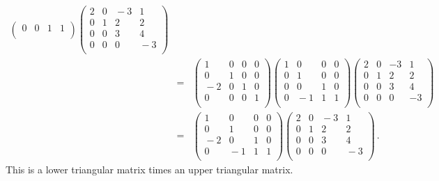 \begin{example}
\begin{eqnarray*}
\begin{pmatrix}
0&0&1&1\\
\end{pmatrix}\!\!\!
\begin{pmatrix}
2&0&\!\!\!-3&1\\
0&1&2&2\\
0&0&3&4\\
0&0&0&\!\!-3\\
\end{pmatrix}
\\[2mm]
&=&\!\!\!\!
\begin{pmatrix}
1&0&0&0\\
0&1&0&0\\
\!-2&0&1&0\\
0&0&0&1\\
\end{pmatrix} 
\begin{pmatrix}
1&0&0&0\\
0&1&0&0\\
0&0&1&0\\
0&\!\!-1&1&1\\
\end{pmatrix}
\begin{pmatrix}
2&0&-3&1\\
0&1&2&2\\
0&0&3&4\\
0&0&0&-3\\
\end{pmatrix}
\\[2mm]
&=&\!\!\!\!
\begin{pmatrix}
1&0&0&0\\
0&1&0&0\\
\!-2&0&1&0\\
0&\!\!-1&1&1\\
\end{pmatrix} 
%
\begin{pmatrix}
2&0&\!\!-3&1\\
0&1&2&2\\
0&0&3&4\\
0&0&0&\!\!-3\\
\end{pmatrix} \, .
\end{eqnarray*}
This is a lower triangular matrix times an upper triangular matrix. 
\end{example}

